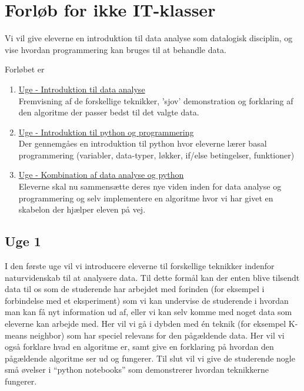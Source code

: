 \documentclass[11pt]{article}
\begin{document}
\section{Forløb for ikke IT-klasser}
 	Vi vil give eleverne en introduktion til data analyse som datalogisk
	disciplin, og vise hvordan programmering kan bruges til at behandle
	data.

    	Forløbet er
    	\begin{enumerate}
        		\item \underline{Uge - Introduktion til data analyse} ~ \\
        		Fremvisning af de forskellige teknikker, 'sjov' demonstration
        		og forklaring af den algoritme der passer bedst til det
        		valgte data.

        		\item \underline{Uge - Introduktion til python og programmering} ~ \\
        		Der gennemgåes en introduktion til python hvor eleverne
        		lærer basal programmering
        		(variabler, data-typer, løkker, if/else betingelser, funktioner)

		\item \underline{Uge - Kombination af data analyse og python} ~ \\
        		Eleverne skal nu sammensætte deres nye viden inden for data
        		analyse og programmering og selv implementere en algoritme
        		hvor vi har givet en skabelon der hjælper eleven på vej.
    \end{enumerate}
    \vspace{-1em}
    \subsection*{Uge 1}
        I den første uge vil vi introducere eleverne til forskellige teknikker
        indenfor naturvidenskab til at analysere data. Til dette formål kan der
        enten blive tilsendt data til os som de studerende har arbejdet med forinden
        (for eksempel i forbindelse med et eksperiment) som vi kan undervise de
        studerende i hvordan man kan få nyt information ud af,
        eller vi kan selv komme med noget data som eleverne kan arbejde med.
        Her vil vi gå i dybden med én teknik (for eksempel K-means neighbor)
        som har speciel relevans for den pågældende data. Her vil vi også forklare
        hvad en algoritme er, samt give en forklaring på hvordan den
        pågældende algoritme ser ud og fungerer. Til slut vil vi give de
        studerende nogle små øvelser i ``python notebooks'' som demonstrerer
        hvordan teknikkerne fungerer.
\end{document}
